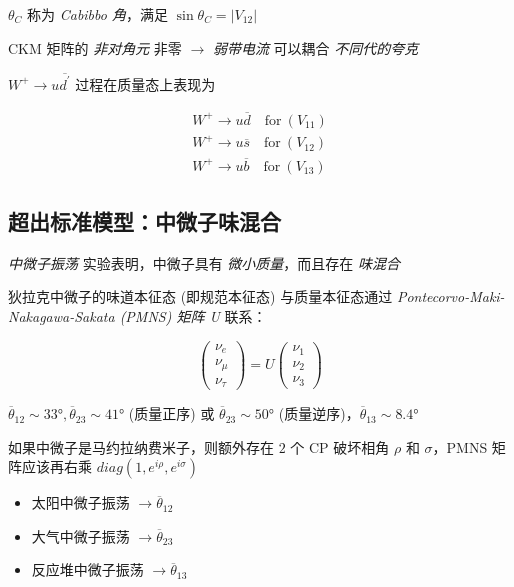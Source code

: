 \documentclass[oneside,a4paper,openany,11pt]{ctexbook}
\begin{document}
$\theta_C$ 称为 \emph{Cabibbo 角}，满足 $\sin \theta_C = |V_{12}|$

CKM 矩阵的 \emph{非对角元} 非零 $\to$ \emph{弱带电流} 可以耦合 \emph{不同代的夸克}

$W^+ \to u \overline{d^\prime}$ 过程在质量态上表现为

\begin{align}
    W^+ \to u \overline{d} \quad \text{for}\ (V_{11})\\
    W^+ \to u \overline{s} \quad \text{for}\ (V_{12})\\
    W^+ \to u \overline{b} \quad \text{for}\ (V_{13})
\end{align}

\subsection{超出标准模型：中微子味混合}

\emph{中微子振荡} 实验表明，中微子具有 \emph{微小质量}，而且存在 \emph{味混合}

狄拉克中微子的味道本征态 (即规范本征态) 与质量本征态通过 \emph{Pontecorvo-Maki-Nakagawa-Sakata (PMNS) 矩阵 U} 联系：

\begin{equation}
    \begin{pmatrix}
        \nu_e \\
        \nu_\mu \\
        \nu_\tau
    \end{pmatrix} = U
    \begin{pmatrix}
        \nu_1 \\
        \nu_2 \\
        \nu_3
    \end{pmatrix}
\end{equation}

$\overline{\theta}_{12} \sim \ang{33}, \overline{\theta}_{23} \sim \ang{41}$ (质量正序) 或 $\overline{\theta}_{23} \sim \ang{50}$ (质量逆序)，$\overline{\theta}_{13} \sim \ang{8.4}$

如果中微子是马约拉纳费米子，则额外存在 $2$ 个 CP 破坏相角 $\rho$ 和 $\sigma$，PMNS 矩阵应该再右乘 $diag(1, e^{i\rho}, e^{i\sigma})$

\begin{itemize}
    \item 太阳中微子振荡 $\to \overline{\theta}_{12}$
    \item 大气中微子振荡 $\to \overline{\theta}_{23}$
    \item 反应堆中微子振荡 $\to \overline{\theta}_{13}$
\end{itemize}
\end{document}
